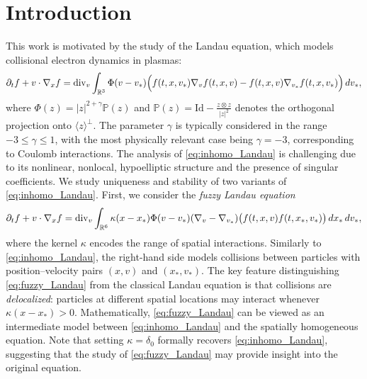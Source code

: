 \documentclass[10pt,oneside]{amsart}
\numberwithin{equation}{section}
\numberwithin{definition}{section}
\numberwithin{theorem}{section}
\numberwithin{lemma}{section}
\begin{document}
\section{Introduction}
This work is motivated by the study of the Landau equation, which models collisional electron dynamics in plasmas:
%
\begin{equation}\label{eq:inhomo_Landau}
\partial_{t}f+v\cdot\nabla_{x}f = \textnormal{div}_v\int_{\mathbb R^3}\Phi(v-v_*)
\Big(f(t,x,v_*)\nabla_v f(t,x,v)-f(t,x,v)\nabla_{v_*} f(t,x,v_*)\Big)\,dv_*,
\end{equation}
%
where $\Phi(z)=|z|^{2+\gamma}\mathbb P(z)$ and $\mathbb P(z)=\mathrm{Id}-\frac{z\otimes z}{|z|^2}$ denotes the orthogonal projection onto $\langle z\rangle^\perp$. The parameter $\gamma$ is typically considered in the range $-3\leq \gamma \leq 1$, with the most physically relevant case being $\gamma=-3$, corresponding to Coulomb interactions. The analysis of \eqref{eq:inhomo_Landau} is challenging due to its nonlinear, nonlocal, hypoelliptic structure and the presence of singular coefficients.
We study uniqueness and stability of two variants of \eqref{eq:inhomo_Landau}. First, we consider the \textit{fuzzy Landau equation}
% 
\begin{equation}\label{eq:fuzzy_Landau}
  \partial_{t}f+v\cdot\nabla_{x}f = \textnormal{div}_v\int_{\mathbb R^6} \kappa(x-x_*)\Phi(v-v_*) (\nabla_v-\nabla_{v_*})\big(f(t,x,v) f(t,x_*,v_*)\big)\,dx_*\,dv_*,
\end{equation}
%
where the kernel $\kappa$ encodes the range of spatial interactions. Similarly to \eqref{eq:inhomo_Landau}, the right-hand side models collisions between particles with position–velocity pairs $(x,v)$ and $(x_*,v_*)$. The key feature distinguishing \eqref{eq:fuzzy_Landau} from the classical Landau equation is that collisions are \emph{delocalized}: particles at different spatial locations may interact whenever $\kappa(x-x_*)>0$. Mathematically, \eqref{eq:fuzzy_Landau} can be viewed as an intermediate model between \eqref{eq:inhomo_Landau} and the spatially homogeneous equation. Note that setting $\kappa=\delta_0$ formally recovers \eqref{eq:inhomo_Landau}, suggesting that the study of \eqref{eq:fuzzy_Landau} may provide insight into the original equation.
\end{document}
